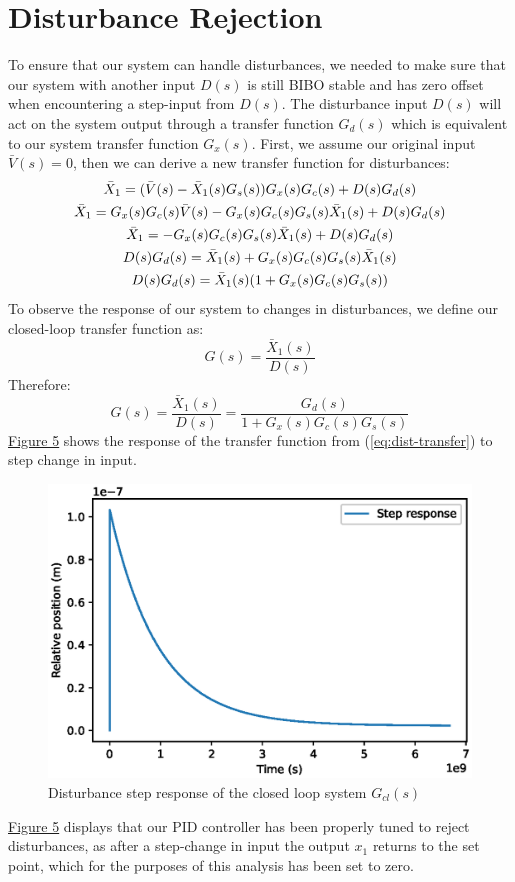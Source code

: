 \documentclass[a4paper,10pt,reqno]{amsart}
\numberwithin{equation}{section}
\begin{document}
\section{Disturbance Rejection} To ensure that our system can handle disturbances, we needed to make sure that our system with another input $D(s)$ is still BIBO stable and has zero offset when encountering a step-input from $D(s)$. The disturbance input $D(s)$ will act on the system output through a transfer function $G_d(s)$ which is equivalent to our system transfer function $G_x(s)$. First, we assume our original input $\bar V(s)=0$, then we can derive a new transfer function for disturbances:
\begin{gather}
    \notag \bar X_1 = (\bar V(s)-\bar X_1(s)G_s(s))G_x(s)G_c(s)+D(s)G_d(s) \\
    \notag \bar X_1 = G_x(s)G_c(s)\bar V(s) - G_x(s)G_c(s)G_s(s)\bar X_1(s) + D(s)G_d(s) \\
    \notag \bar X_1 = -G_x(s)G_c(s)G_s(s)\bar X_1(s) + D(s)G_d(s) \\
    \notag D(s)G_d(s) = \bar X_1(s) + G_x(s)G_c(s)G_s(s)\bar X_1(s) \\
    \notag D(s)G_d(s) = \bar X_1(s)(1 + G_x(s)G_c(s)G_s(s))
\end{gather}
To observe the response of our system to changes in disturbances, we define our closed-loop transfer function as:
\begin{equation*}
    G(s)=\frac{\bar X_1(s)}{D(s)}
\end{equation*}
Therefore:
\begin{equation}
\label{eq:dist-transfer}
    G(s)=\frac{\bar X_1(s)}{D(s)}=\frac{G_d(s)}{1 + G_x(s)G_c(s)G_s(s)}
\end{equation}
\hyperref[fig:dist-step]{Figure 5} shows the response of the transfer function from (\ref{eq:dist-transfer}) to step change in input.
\begin{figure}[!h]
\centering
\includegraphics[width=0.6\linewidth]{g-load-disturbance-rejection.eps}
\caption{Disturbance step response of the closed loop system $G_{cl}(s)$}
\label{fig:dist-step}
\end{figure}
\hyperref[fig:dist-imp]{Figure 5} displays that our PID controller has been properly tuned to reject disturbances, as after a step-change in input the output $x_1$ returns to the set point, which for the purposes of this analysis has been set to zero.
\end{document}

